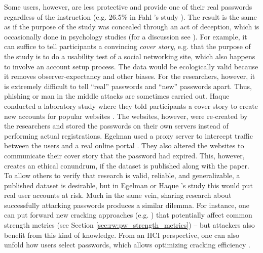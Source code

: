 Some users, however, are less protective and provide one of their real passwords regardless of the instruction (e.g. 26.5\% in Fahl \etal's study \cite{Fahl2013EcologicalValidityPasswordStudy}). The result is the same as if the purpose of the study was concealed through an act of deception, which is occasionally done in psychology studies (for a discussion see \cite{Tai2012Deception}). For example, it can suffice to tell participants a convincing \textit{cover story}, e.g. that the purpose of the study is to do a usability test of a social networking site, which also happens to involve an account setup process. The data would be ecologically valid because it removes observer-expectancy and other biases. For the researchers, however, it is extremely difficult to tell ``real'' passwords and ``new'' passwords apart. Thus, phishing or man in the middle attacks are sometimes carried out. Haque \etal conducted a laboratory study where they told participants a cover story to create new accounts for popular websites \cite{Haque2014Hierarchy}. The websites, however, were re-created by the researchers and stored the passwords on their own servers instead of performing actual registrations. Egelman \etal used a proxy server to intercept traffic between the users and a real online portal \cite{Egelman2013DoesMyPasswordGoUpToEleven}. They also altered the websites to communicate their cover story that the password had expired. This, however, creates an ethical conundrum, if the dataset is published along with the paper. To allow others to verify that research is valid, reliable, and generalizable, a published dataset is desirable, but in Egelman \etal or Haque \etal's study this would put real user accounts at risk.
Much in the same vein, sharing research about successfully attacking passwords produces a similar dilemma. For instance, one can put forward new cracking approaches (e.g. \cite{Marechal2008AdvancesPWCracking, Narayanan2005FastDictionaryAttacks, Schmidt2013Pitfalls, Weir2009PCFG}) that potentially affect common strength metrics (see Section \ref{sec:rw:pw_strength_metrics}) -- but attackers also benefit from this kind of knowledge. From an HCI perspective, one can also unfold how users select passwords, which allows optimizing cracking efficiency \cite{Weir2010MetricsPolicies, Wheeler2016zxcvbn}. 


